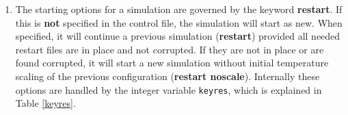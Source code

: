 \begin{enumerate}
\item The starting options for a simulation are governed by the
keyword {\bf restart}.  If this is {\bf not} specified in the
control file, the simulation will start as new.  When specified, it
will continue a previous simulation ({\bf restart}) provided all
needed restart files are in place and not corrupted.  If they are
not in place or are found corrupted, it will start a new simulation
without initial temperature scaling of the previous configuration
({\bf restart noscale}).  Internally these options are handled by
the integer variable {\tt keyres}, which is explained in Table \ref{keyres}.

\begin{table}[htbp]
\end{table}


\end{enumerate}
